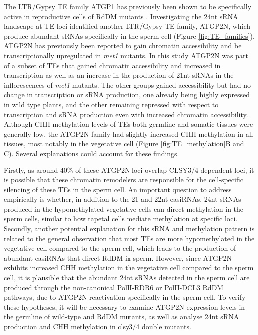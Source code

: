 The LTR/Gypsy TE family ATGP1 has previously been shown to be specifically active in reproductive cells of RdDM mutants \citep{RN187}. Investigating the 24nt sRNA landscape at TE loci identified another LTR/Gypsy TE family, ATGP2N, which produce abundant sRNAs specifically in the sperm cell (Figure \ref{fig:TE_families}). ATGP2N has previously been reported to gain chromatin accessibility and be transcriptionally upregulated in \textit{met1} mutants. In this study ATGP2N was part of a subset of TEs that gained chromatin accessibility and increased in transcription as well as an increase in the production of 21nt sRNAs in the inflorescences of \textit{met1} mutants. The other groups gained accessibility but had no change in transcription or sRNA production, one already being highly expressed in wild type plants, and the other remaining repressed with respect to transcription and sRNA production even with increased chromatin accessibility\citep{RN184}. Although CHH methylation levels of TEs  both germline and somatic tissues were generally low, the ATGP2N family had slightly increased CHH methylation in all tissues, most notably in the vegetative cell (Figure \ref{fig:TE_methylation}B and C). Several explanations could account for these findings. 

Firstly, as around 40\% of these ATGP2N loci overlap CLSY3/4 dependent loci, it is possible that these chromatin remodelers are responsible for the cell-specific silencing of these TEs in the sperm cell. An important question to address empirically is whether, in addition to the 21 and 22nt easiRNAs, 24nt sRNAs produced in the hypomethylated vegetative cells can direct methylation in the sperm cells, similar to how tapetal cells mediate methylation at specific loci. Secondly, another potential explanation for this sRNA and methylation pattern is related to the general observation that most TEs are more hypomethylated in the vegetative cell compared to the sperm cell, which leads to the production of abundant easiRNAs that direct RdDM in sperm.  However, since ATGP2N exhibits increased CHH methylation in the vegetative cell compared to the sperm cell, it is plausible that the abundant 24nt sRNAs detected in the sperm cell are produced through the non-canonical PolII-RDR6 or PolII-DCL3 RdDM pathways, due to ATGP2N reactivation specifically in the sperm cell. To verify these hypotheses, it will be necessary to examine ATGP2N expression levels in the germline of wild-type and RdDM mutants, as well as analyse 24nt sRNA production and CHH methylation in clsy3/4 double mutants.

